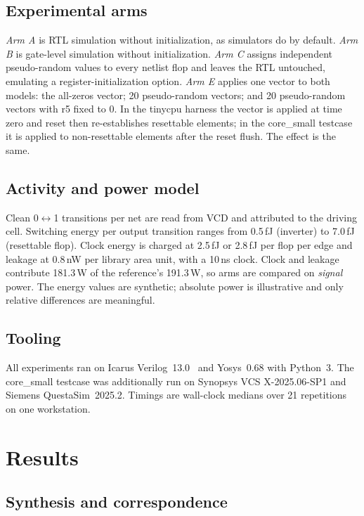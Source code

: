 \documentclass[journal]{IEEEtran}
\begin{document}
\subsection{Experimental arms}
\emph{Arm A} is RTL simulation without initialization, as simulators do by
default. \emph{Arm B} is gate-level simulation without initialization.
\emph{Arm C} assigns independent pseudo-random values to every netlist flop and
leaves the RTL untouched, emulating a register-initialization option.
\emph{Arm E} applies one vector to both models: the all-zeros vector; 20
pseudo-random vectors; and 20 pseudo-random vectors with r5 fixed to 0. In the
tinycpu harness the vector is applied at time zero and reset then re-establishes
resettable elements; in the core\_small testcase it is applied to non-resettable
elements after the reset flush. The effect is the same.

\subsection{Activity and power model}
Clean 0$\leftrightarrow$1 transitions per net are read from VCD and attributed to
the driving cell. Switching energy per output transition ranges from 0.5\,fJ
(inverter) to 7.0\,fJ (resettable flop). Clock energy is charged at 2.5\,fJ or
2.8\,fJ per flop per edge and leakage at 0.8\,nW per library area unit, with a
10\,ns clock. Clock and leakage contribute 181.3\,\textmu W of the reference's
191.3\,\textmu W, so arms are compared on \emph{signal} power. The energy values
are synthetic; absolute power is illustrative and only relative differences are
meaningful.

\subsection{Tooling}
All experiments ran on Icarus Verilog~13.0~\cite{icarus} and Yosys~0.68 with
Python~3. The core\_small testcase was additionally run on Synopsys VCS
X-2025.06-SP1 and Siemens QuestaSim~2025.2. Timings are wall-clock medians over
21 repetitions on one workstation.

\section{Results}

\subsection{Synthesis and correspondence}
\end{document}
